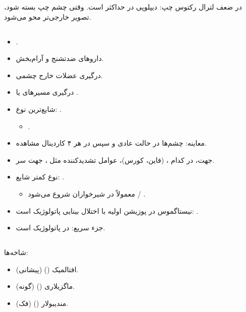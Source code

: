 \documentclass[a4paper,12pt]{extbook}
\begin{document}
در ضعف لترال رکتوس چپ: دیپلوپی در  حداکثر است. وقتی چشم چپ بسته شود، تصویر خارجی‌تر محو می‌شود.
\subsection*{}
\subsubsection*{}
\begin{itemize}
\item {}.
\item داروهای ضدتشنج و آرام‌بخش.
\item درگیری عضلات خارج چشمی.
\item درگیری مسیرهای  یا .
\item شایع‌ترین نوع: .
  \begin{itemize}
  \item {}.
  \end{itemize}
\item معاینه: چشم‌ها در حالت عادی و سپس در هر ۴  کاردینال مشاهده.
\item جهت، در کدام ،  (فاین، کورس)، عوامل تشدیدکننده مثل ، جهت سر.
\item نوع کمتر شایع: .
  \begin{itemize}
  \item معمولاً در شیرخواران شروع می‌شود / .
  \end{itemize}
\item نیستاگموس در پوزیشن اولیه با اختلال بینایی پاتولوژیک است: .
\item جزء سریع:  در پاتولوژیک است.
\end{itemize}
\subsection*{}
شاخه‌ها:
\begin{itemize}
\item افتالمیک () (پیشانی).
\item ماگزیلاری () (گونه).
\item مندیبولار () (فک).
\end{itemize}
\end{document}
